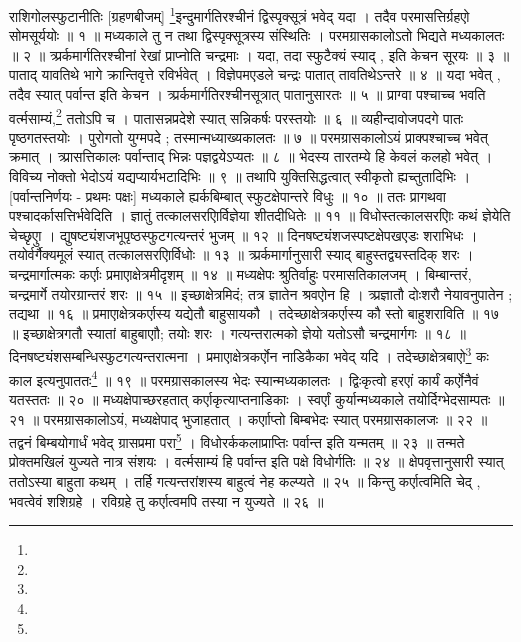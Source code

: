 राशिगोलस्फुटानीतिः 
[ग्रहणबीजम्]
\footnote{}इन्दुमार्गतिरश्चीनं द्विस्पृक्सूत्रं भवेद् यदा ।
तदैव परमासत्तिर्ग्रहएो सोमसूर्ययोः ॥ १ ॥
मध्यकाले तु न तथा द्विस्पृक्सूत्रस्य संस्थितिः ।
परमग्रासकालोऽतो भिद्यते मध्यकालतः ॥ २ ॥
त्र्प्रर्कमार्गतिरश्चीनां रेखां प्राप्नोति चन्द्रमाः ।
यदा, तदा स्फुटैक्यं स्याद् , इति केचन सूरयः ॥ ३ ॥
पाताद् यावतिथे भागे क्रान्तिवृत्ते रविर्भवेत् ।
विज्ञेपमएडले चन्द्रः पातात् तावतिथेऽन्तरे ॥ ४ ॥
यदा भवेत् , तदैव स्यात् पर्वान्त इति केचन ।
त्र्प्रर्कमार्गतिरश्चीनसूत्रात् पातानुसारतः ॥ ५ ॥
प्राग्वा पश्चाच्च भवति वर्त्मसाम्यं,\footnote{} ततोऽपि च ।
पातासन्नप्रदेशे स्यात् सन्निकर्षः परस्तयोः ॥ ६ ॥
व्यहीन्दावोजपदगे पातः पृष्ठगतस्तयोः ।
पुरोगतो युग्मपदे ; तस्मान्मध्याख्यकालतः ॥ ७ ॥
परमग्रासकालोऽयं प्राक्पश्चाच्च भवेत् क्रमात् ।
त्र्प्रासत्तिकालः पर्वान्ताद् भिन्नः पज्ञद्वयेऽप्यतः ॥ ८ ॥
भेदस्य तारतम्ये हि केवलं कलहो भवेत् ।
विविच्य नोक्तो भेदोऽयं यद्यप्यार्यभटादिभिः ॥ ९ ॥
तथापि युक्तिसिद्धत्वात् स्वीकृतो ह्यच्तुतादिभिः ।
[पर्वान्तनिर्णयः - प्रथमः पक्षः]
मध्यकाले ह्यर्कबिम्बात् स्फुटक्षेपान्तरे विधुः ॥ १० ॥
ततः प्रागथवा पश्चादर्कासत्तिर्भवेदिति ।
ज्ञातुं तत्कालसरएािर्विज्ञेया शीतदीधितेः ॥ ११ ॥
विधोस्तत्कालसरएािः कथं ज्ञेयेति चेच्छृएाु ।
द्युषष्ट्यंशजभूपृष्ठस्फुटगत्यन्तरं भुजम् ॥ १२ ॥
दिनषष्ट्यंशजस्पष्टक्षेपखएडः शराभिधः ।
तयोर्वर्गैक्यमूलं स्यात् तत्कालसरएािर्विधोः  ॥ १३ ॥
त्र्प्रर्कमार्गानुसारी स्याद् बाहुस्तद्व्यस्तदिक् शरः ।
चन्द्रमार्गात्मकः कर्एाः	प्रमाएाक्षेत्रमीदृशम् ॥ १४ ॥
मध्यक्षेपः श्रुतिर्वाहुः परमासतिकालजम् ।
बिम्बान्तरं, चन्द्रमार्गे तयोरग्रान्तरं शरः ॥ १५ ॥
इच्छाक्षेत्रमिदं; तत्र ज्ञातेन श्रवएोन हि ।
त्र्प्रज्ञातौ दोःशरौ नेयावनुपातेन ; तद्यथा ॥ १६ ॥
प्रमाएाक्षेत्रकर्एास्य यद्येतौ बाहुसायकौ ।
तदेच्छाक्षेत्रकर्एास्य कौ स्तो बाहुशराविति ॥ १७ ॥
इच्छाक्षेत्रगतौ स्यातां बाहुबाएाौ; तयोः शरः ।
गत्यन्तरात्मको ज्ञेयो यतोऽसौ चन्द्रमार्गगः ॥ १८ ॥
दिनषष्ट्यंशसम्बन्धिस्फुटगत्यन्तरात्मना । 
प्रमाएाक्षेत्रकर्एोन नाडिकैका भवेद् यदि ।
तदेच्छाक्षेत्रबाएो\footnote{} कः काल इत्यनुपाततः\footnote{} ॥ १९ ॥
परमग्रासकालस्य भेदः स्यान्मध्यकालतः ।
द्विःकृत्वो हरएां कार्यं कर्एोनैवं यतस्ततः ॥ २० ॥
मध्यक्षेपाच्छरहतात् कर्एाकृत्याप्तनाडिकाः ।
स्वर्एां कुर्यान्मध्यकाले तयोर्दिग्भेदसाम्पतः ॥ २१ ॥
परमग्रासकालोऽयं, मध्यक्षेपाद् भुजाहतात् ।
कर्एााप्तो बिम्बभेदः स्यात् परमग्रासकालजः ॥ २२ ॥
तद्वनं बिम्बयोगार्धं भवेद् ग्रासप्रमा परा\footnote{} ।
विधोरर्ककलाप्राप्तिः पर्वान्त इति यन्मतम् ॥ २३ ॥
तन्मते प्रोक्तमखिलं युज्यते नात्र संशयः ।
वर्त्मसाम्यं हि पर्वान्त इति पक्षे विधोर्गतिः ॥ २४ ॥
क्षेपवृत्तानुसारी स्यात् ततोऽस्या बाहुता कथम् ।
तर्हि गत्यन्तरांशस्य बाहुत्वं नेह कल्प्यते ॥ २५ ॥
किन्तु कर्एात्वमिति चेद् , भवत्वेवं शशिग्रहे ।
रविग्रहे तु कर्एात्वमपि तस्या न युज्यते ॥ २६ ॥
